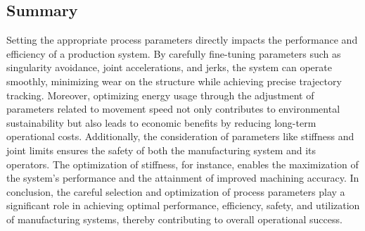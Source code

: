 \subsection{Summary}
Setting the appropriate process parameters directly impacts the performance and efficiency of a production system. By carefully fine-tuning parameters such as singularity avoidance, joint accelerations, and jerks, the system can operate smoothly, minimizing wear on the structure while achieving precise trajectory tracking. Moreover, optimizing energy usage through the adjustment of parameters related to movement speed not only contributes to environmental sustainability but also leads to economic benefits by reducing long-term operational costs. Additionally, the consideration of parameters like stiffness and joint limits ensures the safety of both the manufacturing system and its operators. The optimization of stiffness, for instance, enables the maximization of the system's performance and the attainment of improved machining accuracy. In conclusion, the careful selection and optimization of process parameters play a significant role in achieving optimal performance, efficiency, safety, and utilization of manufacturing systems, thereby contributing to overall operational success.